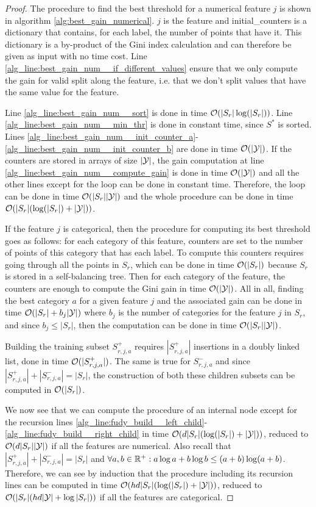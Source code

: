 \begin{proof}
    The procedure to find the best threshold for a numerical feature $j$ is shown in algorithm \ref{alg:best_gain_numerical}. $j$ is the feature and initial\_counters is a dictionary that contains, for each label, the number of points that have it. This dictionary is a by-product of the Gini index calculation and can therefore be given as input with no time cost. Line \ref{alg_line:best_gain_num__if_different_values} ensure that we only compute the gain for valid split along the feature, i.e. that we don't split values that have the same value for the feature.

    Line \ref{alg_line:best_gain_num__sort} is done in time $\mathcal{O}(|S_r|\log(|S_r|))$. Line \ref{alg_line:best_gain_num__min_thr} is done in constant time, since $S^*$ is sorted. Lines \ref{alg_line:best_gain_num__init_counter_a}-\ref{alg_line:best_gain_num__init_counter_b} are done in time $\mathcal{O}(|\mathcal{Y}|)$. If the counters are stored in arrays of size $|\mathcal{Y}|$, the gain computation at line \ref{alg_line:best_gain_num__compute_gain} is done in time $\mathcal{O}(|\mathcal{Y}|)$ and all the other lines except for the loop can be done in constant time. Therefore, the loop can be done in time $\mathcal{O}(|S_r||\mathcal{Y}|)$ and the whole procedure can be done in time $\mathcal{O}(|S_r|(\log(|S_r|) + |\mathcal{Y}|))$.

    If the feature $j$ is categorical, then the procedure for computing its best threshold goes as follows: for each category of this feature, counters are set to the number of points of this category that has each label. To compute this counters requires going through all the points in $S_r$, which can be done in time $\mathcal{O}(|S_r|)$ because $S_r$ is stored in a self-balancing tree. Then for each category of the feature, the counters are enough to compute the Gini gain in time $\mathcal{O}(|\mathcal{Y}|)$. All in all, finding the best category $a$ for a given feature $j$ and the associated gain can be done in time $\mathcal{O}(|S_r| + b_j|\mathcal{Y}|)$ where $b_j$ is the number of categories for the feature $j$ in $S_r$, and since $b_j \leq |S_r|$, then the computation can be done in time  $\mathcal{O}(|S_r||\mathcal{Y}|)$.

    Building the training subset $S^+_{r,j,a}$ requires $|S^+_{r,j,a}|$ insertions in a doubly linked list, done in time $\mathcal{O}(|S^+_{r,j,a}|)$. The same is true for $S^-_{r,j,a}$ and since $|S^+_{r,j,a}| + |S^-_{r,j,a}| = |S_r|$, the construction of both these children subsets can be computed in $\mathcal{O}(|S_r|)$.

    We now see that we can compute the \AlgoBuild{} procedure of an internal node except for the recursion lines \ref{alg_line:fudy_build__left_child}-\ref{alg_line:fudy_build__right_child} in time $\mathcal{O}(d|S_r|(\log(|S_r|) + |\mathcal{Y}|))$, reduced to $\mathcal{O}(d|S_r||\mathcal{Y}|)$ if all the features are numerical. Also recall that $|S^+_{r,j,a}| + |S^-_{r,j,a}| = |S_r|$ and $\forall a, b \in \mathbb{R}^+: a\log a + b \log b \leq (a+b)\log(a+b)$. Therefore, we can see by induction that the \AlgoBuild{} procedure including its recursion lines can be computed in time $\mathcal{O}(hd|S_r|(\log(|S_r|) + |\mathcal{Y}|))$, reduced to $\mathcal{O}(|S_r|(hd|\mathcal{Y}| + \log |S_r|))$ if all the features are categorical.
\end{proof}

